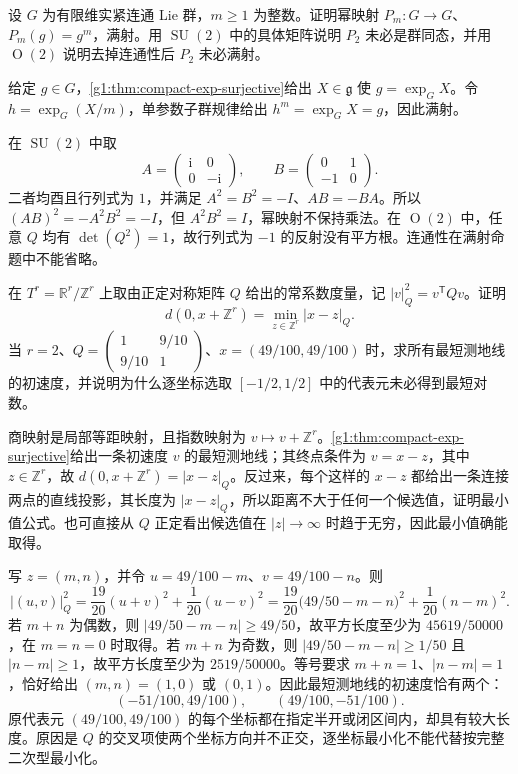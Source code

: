 \begin{exercise}\label{g1:ex:compact-group-power-map}
	设 \(G\) 为有限维实紧连通 Lie 群，\(m\ge1\) 为整数。证明幂映射 \(P_m:G\to G\)、\(P_m(g)=g^m\)，满射。用 \(\operatorname{SU}(2)\) 中的具体矩阵说明 \(P_2\) 未必是群同态，并用 \(\operatorname{O}(2)\) 说明去掉连通性后 \(P_2\) 未必满射。
\end{exercise}
\begin{solution}
	给定 \(g\in G\)，\cref{g1:thm:compact-exp-surjective}给出 \(X\in\mathfrak g\) 使 \(g=\exp_GX\)。令 \(h=\exp_G(X/m)\)，单参数子群规律给出 \(h^m=\exp_GX=g\)，因此满射。

	在 \(\operatorname{SU}(2)\) 中取
	\[
		A=\begin{pmatrix}\mathrm{i}&0\\0&-\mathrm{i}\end{pmatrix},
		\qquad B=\begin{pmatrix}0&1\\-1&0\end{pmatrix}.
	\]
	二者均酉且行列式为 \(1\)，并满足 \(A^2=B^2=-I\)、\(AB=-BA\)。所以 \((AB)^2=-A^2B^2=-I\)，但 \(A^2B^2=I\)，幂映射不保持乘法。在 \(\operatorname{O}(2)\) 中，任意 \(Q\) 均有 \(\det(Q^2)=1\)，故行列式为 \(-1\) 的反射没有平方根。连通性在满射命题中不能省略。
\end{solution}

\begin{exercise}\label{g1:ex:flat-torus-shortest-logarithms}
	在 \(T^r=\mathbb R^r/\mathbb Z^r\) 上取由正定对称矩阵 \(Q\) 给出的常系数度量，记 \(|v|_Q^2=v^{\mathsf T}Qv\)。证明
	\[
		d(0,x+\mathbb Z^r)=\min_{z\in\mathbb Z^r}|x-z|_Q.
	\]
	当 \(r=2\)、\(Q=\left(\begin{smallmatrix}1&9/10\\9/10&1\end{smallmatrix}\right)\)、\(x=(49/100,49/100)\) 时，求所有最短测地线的初速度，并说明为什么逐坐标选取 \([-1/2,1/2]\) 中的代表元未必得到最短对数。
\end{exercise}
\begin{solution}
	商映射是局部等距映射，且指数映射为 \(v\mapsto v+\mathbb Z^r\)。\cref{g1:thm:compact-exp-surjective}给出一条初速度 \(v\) 的最短测地线；其终点条件为 \(v=x-z\)，其中 \(z\in\mathbb Z^r\)，故 \(d(0,x+\mathbb Z^r)=|x-z|_Q\)。反过来，每个这样的 \(x-z\) 都给出一条连接两点的直线投影，其长度为 \(|x-z|_Q\)，所以距离不大于任何一个候选值，证明最小值公式。也可直接从 \(Q\) 正定看出候选值在 \(|z|\to\infty\) 时趋于无穷，因此最小值确能取得。

	写 \(z=(m,n)\)，并令 \(u=49/100-m\)、\(v=49/100-n\)。则
	\[
		|(u,v)|_Q^2
		=\frac{19}{20}(u+v)^2+\frac1{20}(u-v)^2
		=\frac{19}{20}\bigl(49/50-m-n\bigr)^2
		+\frac1{20}(n-m)^2.
	\]
	若 \(m+n\) 为偶数，则 \(|49/50-m-n|\ge49/50\)，故平方长度至少为 \(45619/50000\)，在 \(m=n=0\) 时取得。若 \(m+n\) 为奇数，则 \(|49/50-m-n|\ge1/50\) 且 \(|n-m|\ge1\)，故平方长度至少为 \(2519/50000\)。等号要求 \(m+n=1\)、\(|n-m|=1\)，恰好给出 \((m,n)=(1,0)\) 或 \((0,1)\)。因此最短测地线的初速度恰有两个：
	\[
		(-51/100,49/100),\qquad(49/100,-51/100).
	\]
	原代表元 \((49/100,49/100)\) 的每个坐标都在指定半开或闭区间内，却具有较大长度。原因是 \(Q\) 的交叉项使两个坐标方向并不正交，逐坐标最小化不能代替按完整二次型最小化。
\end{solution}

